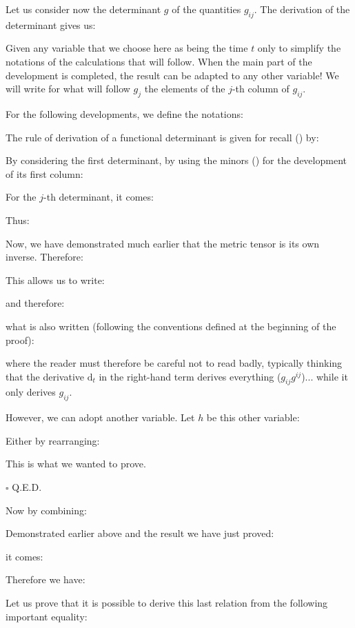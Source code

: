 	\begin{theorem}
	Let us consider now the determinant $g$ of the quantities $g_{ij}$. The derivation of the determinant gives us:
	
	\end{theorem}
	\begin{dem}
	Given any variable that we choose here as being the time $t$ only to simplify the notations of the calculations that will follow. When the main part of the development is completed, the result can be adapted to any other variable! We will write for what will follow $g_j$ the elements of the $j$-th column of $g_{ij}$.

	For the following developments, we define the notations:
	
	The rule of derivation of a functional determinant is given for recall () by:
	
	By considering the first determinant, by using the minors () for the development of its first column:
	
	For the $j$-th determinant, it comes:
	
	Thus:
	
	Now, we have demonstrated much earlier that the metric tensor is its own inverse. Therefore:
	
	This allows us to write:
	
	and therefore:
	
	what is also written (following the conventions defined at the beginning of the proof):
	
	where the reader must therefore be careful not to read badly, typically thinking that the derivative $\mathrm{d}_t$ in the right-hand term derives everything ($g_{ij}g^{ij}$)... while it only derives $g_{ij}$.
	
	However, we can adopt another variable. Let $h$ be this other variable:
	
	Either by rearranging:
	
	This is what we wanted to prove.
	\begin{flushright}
		$\square$  Q.E.D.
	\end{flushright}
	\end{dem}
	Now by combining:
	
	Demonstrated earlier above and the result we have just proved:
	
	it comes:
	
	Therefore we have:
	
	Let us prove that it is possible to derive this last relation from the following important equality:
	
